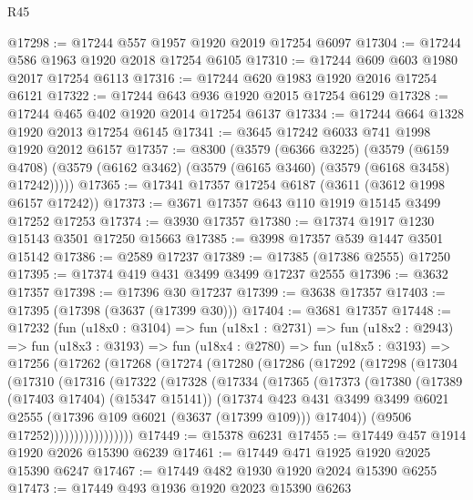 \begin{lexlean}{R45}
\begin{coremodule}
@17298 := @17244 @557 @1957 @1920 @2019 @17254 @6097
@17304 := @17244 @586 @1963 @1920 @2018 @17254 @6105
@17310 := @17244 @609 @603 @1980 @2017 @17254 @6113
@17316 := @17244 @620 @1983 @1920 @2016 @17254 @6121
@17322 := @17244 @643 @936 @1920 @2015 @17254 @6129
@17328 := @17244 @465 @402 @1920 @2014 @17254 @6137
@17334 := @17244 @664 @1328 @1920 @2013 @17254 @6145
@17341 := @3645 @17242 @6033 @741 @1998 @1920 @2012 @6157
@17357 := @8300
    (@3579
      (@6366 @3225)
      (@3579
        (@6159 @4708)
        (@3579 (@6162 @3462) (@3579 (@6165 @3460) (@3579 (@6168 @3458) @17242)))))
@17365 := @17341 @17357 @17254 @6187 (@3611 (@3612 @1998 @6157 @17242))
@17373 := @3671 @17357 @643 @110 @1919 @15145 @3499 @17252 @17253
@17374 := @3930 @17357
@17380 := @17374 @1917 @1230 @15143 @3501 @17250 @15663
@17385 := @3998 @17357 @539 @1447 @3501 @15142
@17386 := @2589 @17237
@17389 := @17385 (@17386 @2555) @17250
@17395 := @17374 @419 @431 @3499 @3499 @17237 @2555
@17396 := @3632 @17357
@17398 := @17396 @30 @17237
@17399 := @3638 @17357
@17403 := @17395 (@17398 (@3637 (@17399 @30)))
@17404 := @3681 @17357
@17448 := @17232
    (fun (u18x0 : @3104) =>
    fun (u18x1 : @2731) =>
    fun (u18x2 : @2943) =>
    fun (u18x3 : @3193) =>
    fun (u18x4 : @2780) =>
    fun (u18x5 : @3193) =>
    @17256
      (@17262
        (@17268
          (@17274
            (@17280
              (@17286
                (@17292
                  (@17298
                    (@17304
                      (@17310
                        (@17316
                          (@17322
                            (@17328
                              (@17334
                                (@17365
                                  (@17373
                                    (@17380
                                      (@17389 (@17403 @17404) (@15347 @15141))
                                      (@17374
                                        @423
                                        @431
                                        @3499
                                        @3499
                                        @6021
                                        @2555
                                        (@17396 @109 @6021 (@3637 (@17399 @109)))
                                        @17404))
                                    (@9506 @17252)))))))))))))))))
@17449 := @15378 @6231
@17455 := @17449 @457 @1914 @1920 @2026 @15390 @6239
@17461 := @17449 @471 @1925 @1920 @2025 @15390 @6247
@17467 := @17449 @482 @1930 @1920 @2024 @15390 @6255
@17473 := @17449 @493 @1936 @1920 @2023 @15390 @6263

\end{coremodule}
\end{lexlean}
